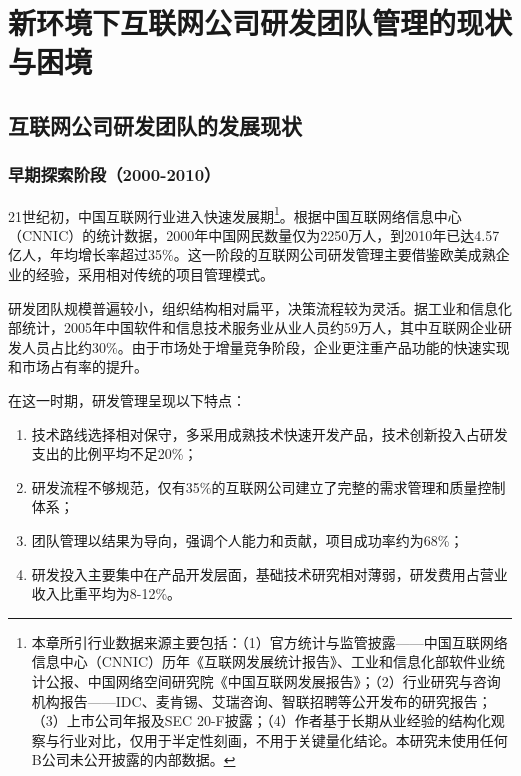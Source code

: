 
\chapter{新环境下互联网公司研发团队管理的现状与困境}

\section{互联网公司研发团队的发展现状}

\subsection{早期探索阶段（2000-2010）}

21世纪初，中国互联网行业进入快速发展期\cite{cnnic2024report}\footnote{本章所引行业数据来源主要包括：（1）官方统计与监管披露——中国互联网络信息中心（CNNIC）历年《互联网发展统计报告》、工业和信息化部软件业统计公报、中国网络空间研究院《中国互联网发展报告》；（2）行业研究与咨询机构报告——IDC、麦肯锡、艾瑞咨询、智联招聘等公开发布的研究报告；（3）上市公司年报及SEC 20-F披露；（4）作者基于长期从业经验的结构化观察与行业对比，仅用于半定性刻画，不用于关键量化结论。本研究未使用任何B公司未公开披露的内部数据。}。根据中国互联网络信息中心（CNNIC）的统计数据，2000年中国网民数量仅为2250万人，到2010年已达4.57亿人，年均增长率超过35\%\cite{cnnic2024report}。这一阶段的互联网公司研发管理主要借鉴欧美成熟企业的经验，采用相对传统的项目管理模式\cite{ouyang2005ceo}。

研发团队规模普遍较小，组织结构相对扁平，决策流程较为灵活。据工业和信息化部统计，2005年中国软件和信息技术服务业从业人员约59万人，其中互联网企业研发人员占比约30\%\cite{miit2024software}。由于市场处于增量竞争阶段，企业更注重产品功能的快速实现和市场占有率的提升\cite{cac2023internet}。

在这一时期，研发管理呈现以下特点：

\begin{enumerate}
\item 技术路线选择相对保守，多采用成熟技术快速开发产品，技术创新投入占研发支出的比例平均不足20\%；
\item 研发流程不够规范，仅有35\%的互联网公司建立了完整的需求管理和质量控制体系\cite{wei2012excellence}；
\item 团队管理以结果为导向，强调个人能力和贡献，项目成功率约为68\%；
\item 研发投入主要集中在产品开发层面，基础技术研究相对薄弱，研发费用占营业收入比重平均为8-12\%。
\end{enumerate}

